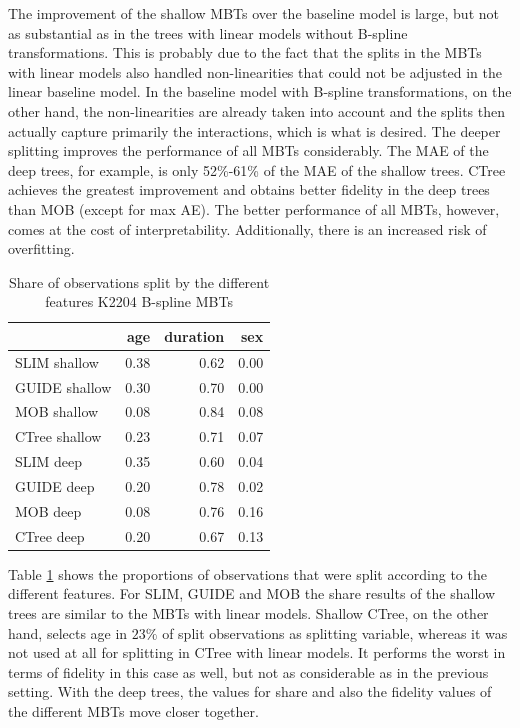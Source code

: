 The improvement of the shallow MBTs over the baseline model is large, but not as substantial as in the trees with linear models without B-spline transformations. This is probably due to the fact that the splits in the MBTs with linear models also handled non-linearities that could not be adjusted in the linear baseline model. In the baseline model with B-spline transformations, on the other hand, the non-linearities are already taken into account and the splits then actually capture primarily the interactions, which is what is desired. 
The deeper splitting improves the performance of all MBTs considerably. The MAE of the deep trees, for example, is only 52\%-61\% of the MAE of the shallow trees. CTree achieves the greatest improvement and obtains better fidelity in the deep trees than MOB (except for max AE). The better performance of all MBTs, however, comes at the cost of interpretability. Additionally, there is an increased risk of overfitting.




\begin{table}[!htb]
\centering \scriptsize
\begin{tabular}[t]{l|r|r|r}
\hline
  & age & duration & sex\\
\hline
SLIM shallow & 0.38 & 0.62 & 0.00\\
GUIDE shallow & 0.30 & 0.70 & 0.00\\
MOB shallow & 0.08 & 0.84 & 0.08\\
CTree shallow & 0.23 & 0.71 & 0.07\\
\hline
SLIM deep & 0.35 & 0.60 & 0.04\\
GUIDE deep & 0.20 & 0.78 & 0.02\\
MOB deep & 0.08 & 0.76 & 0.16\\
CTree deep & 0.20 & 0.67 & 0.13\\
\hline
\end{tabular}
\caption{Share of observations split by the different features K2204 B-spline MBTs}
\label{tab:ins_k2204_bsplines_surrogates_share}
\end{table}

Table \ref{tab:ins_k2204_bsplines_surrogates_share}  shows the proportions of observations that were split according to the different features. 
For SLIM, GUIDE and MOB the share results of the shallow trees are similar to the MBTs with linear models. Shallow CTree, on the other hand, selects age in $23\%$ of split observations as splitting variable, whereas it was not used at all for splitting in CTree with linear models. It performs the worst in terms of fidelity in this case as well, but not as considerable as in the previous setting.
With the deep trees, the values for share and also the fidelity values of the different MBTs move closer together.



